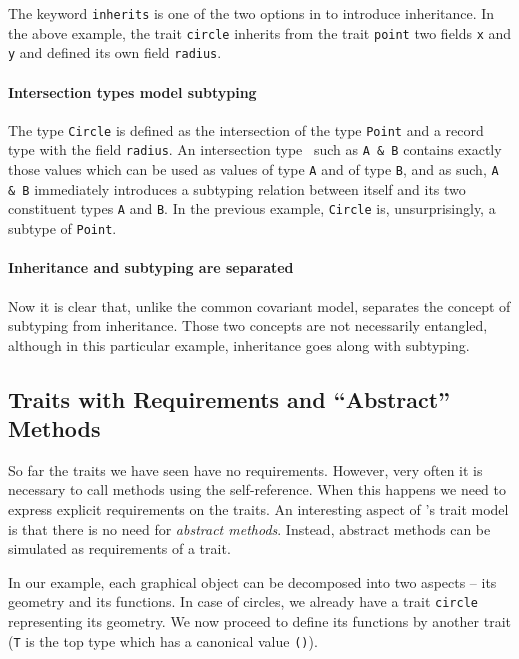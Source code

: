 The keyword \lstinline{inherits} is one of the two options in \name to introduce
inheritance. In the above example, the trait \lstinline{circle} inherits from
the trait \lstinline{point} two fields \lstinline{x} and \lstinline{y}
and defined its own field \lstinline{radius}.

\paragraph{Intersection types model subtyping}
The type \lstinline{Circle} is defined as the intersection of the type
\lstinline{Point} and a record type with the field \lstinline{radius}. An
intersection type~\cite{coppo1981functional,pottinger1980type} such as
\lstinline{A & B} contains exactly those values which can be used as values of
type \lstinline{A} and of type \lstinline{B}, and as such, \lstinline{A & B}
immediately introduces a subtyping relation between itself and its two
constituent types \lstinline{A} and \lstinline{B}. In the previous example,
\lstinline{Circle} is, unsurprisingly, a subtype of \lstinline{Point}.

\paragraph{Inheritance and subtyping are separated}
Now it is clear that, unlike the common covariant
model, \name separates the concept of subtyping from inheritance. Those two
concepts are not necessarily entangled, although in this particular example,
inheritance goes along with subtyping.

\subsection{Traits with Requirements and ``Abstract'' Methods}

So far the traits we have seen have no requirements. However, very often it is
necessary to call methods using the self-reference. When this happens
we need to express explicit requirements on the traits. An interesting aspect
of \name's trait model is that there is no need for \emph{abstract
  methods}. Instead, abstract methods can be simulated as requirements 
of a trait. 

In our example, each graphical object can be decomposed into two aspects -- its
geometry and its functions. In case of circles, we already have a trait
\lstinline{circle} representing its geometry. We now proceed to define its
functions by another trait (\lstinline{T} is the top type which has a canonical
value \lstinline{()}).

